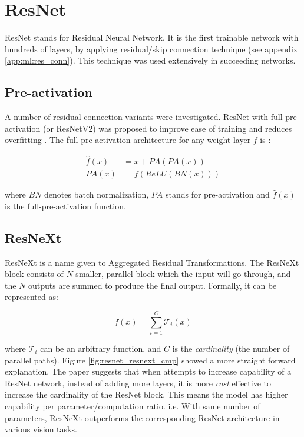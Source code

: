 \section{ResNet}
ResNet stands for Residual Neural Network. It is the first trainable network with hundreds of layers, by applying residual/skip connection technique (see appendix \ref{app:ml:res_conn}). This technique was used extensively in succeeding networks.

\subsection{Pre-activation}
A number of residual connection variants were investigated. ResNet with full-pre-activation (or ResNetV2) was proposed to improve ease of training and reduces overfitting \cite{heIdentityMappingsDeep2016a}. The full-pre-activation architecture for any weight layer $f$ is :


\begin{align}
    \hat{f}(x) &= x + PA(PA(x))\\
    PA(x) &= f(ReLU(BN(x)))
\end{align}


where $BN$ denotes batch normalization, $PA$ stands for pre-activation and $\hat{f}(x)$ is the full-pre-activation function. 


\subsection{ResNeXt}
ResNeXt is a name given to Aggregated Residual Transformations\cite{xieAggregatedResidualTransformations2017a}. The ResNeXt block consists of $N$ smaller, parallel block which the input will go through, and the $N$ outputs are summed to produce the final output. Formally, it can be represented as:

$$
f(x)=\sum^{C}_{i=1} \mathcal{T}_i(x)
$$

where $\mathcal{T}_i$ can be an arbitrary function, and $C$ is the \textit{cardinality} (the number of parallel paths). Figure \ref{fig:resnet_resnext_cmp} showed a more straight forward explanation. The paper suggests that when attempts to increase capability of a ResNet network, instead of adding more layers, it is more \textit{cost} effective to increase the cardinality of the ResNet block. This means the model has higher capability per parameter/computation ratio. i.e. With same number of parameters, ResNeXt outperforms the corresponding ResNet architecture in various vision tasks.

